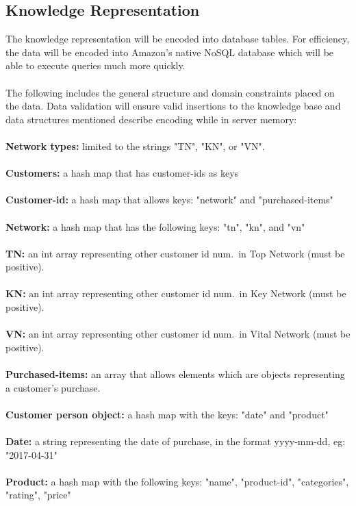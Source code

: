 \documentclass[12pt,a4paper]{article}
\begin{document}
	\subsection*{Knowledge Representation}
		The knowledge representation will be encoded into database tables. For efficiency, the data will be encoded into Amazon's native NoSQL database which will be able to execute queries much more quickly. 
		\\\\
		The following includes the general structure and domain constraints placed on the data. Data validation will ensure valid insertions to the knowledge base and data structures mentioned describe encoding while in server memory: 
		\\\\
		\textbf{Network types:} limited to the strings "TN", "KN", or "VN". \\
		\\
		\textbf{Customers:} a hash map that has customer-ids as keys\\
		\\
		\textbf{Customer-id:} a hash map that allows keys: "network" and "purchased-items"\\
		\\
		\textbf{Network:} a hash map that has the following keys: "tn", "kn", and "vn"\\
		\\
		\textbf{TN:} an int array representing other customer id num.\ in Top Network (must be positive).\\ 
		\\
		\textbf{KN:} an int array representing other customer id num.\ in Key Network (must be positive). \\
		\\
		\textbf{VN:} an int array representing other customer id num.\ in Vital Network (must be positive).\\ 
		\\
		\textbf{Purchased-items:} an array that allows elements which are objects representing a customer's purchase.\\
		\\
		\textbf{Customer person object:} a hash map with the keys: "date" and "product"\\
		\\
		\textbf{Date:} a string representing the date of purchase, in the format yyyy-mm-dd, eg: "2017-04-31"\\
		\\
		\textbf{Product:} a hash map with the following keys: "name", "product-id", "categories", "rating", "price"\\
\end{document}
